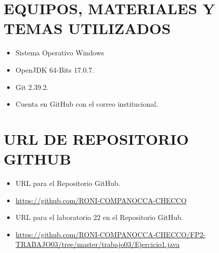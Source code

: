 \documentclass{article}
\begin{document}
    \section{EQUIPOS, MATERIALES Y TEMAS UTILIZADOS}
	\begin{itemize}
		\item Sistema Operativo Windows
		\item OpenJDK 64-Bits 17.0.7.
		\item Git 2.39.2.	
  	\item Cuenta en GitHub con el correo institucional.
	\end{itemize}

    \section{URL DE REPOSITORIO GITHUB}
	\begin{itemize}
		\item URL para el Repositorio GitHub.
		\item \url{https://github.com/RONI-COMPANOCCA-CHECCO}
		\item URL para el laboratorio 22 en el Repositorio GitHub.	
        \item \url{https://github.com/RONI-COMPANOCCA-CHECCO/FP2-TRABAJO03/tree/master/trabajo03/Ejercicio1.java}
	\end{itemize}
    
\end{document}
